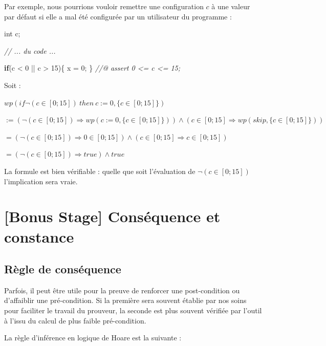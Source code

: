 \documentclass[12pt,francais,]{scrbook}
\newenvironment{Shaded}{}{}
\newcommand{\KeywordTok}[1]{\textcolor[rgb]{0.00,0.44,0.13}{\textbf{{#1}}}}
\newcommand{\DataTypeTok}[1]{\textcolor[rgb]{0.56,0.13,0.00}{{#1}}}
\newcommand{\DecValTok}[1]{\textcolor[rgb]{0.25,0.63,0.44}{{#1}}}
\newcommand{\CommentTok}[1]{\textcolor[rgb]{0.38,0.63,0.69}{\textit{{#1}}}}
\newcommand{\NormalTok}[1]{{#1}}
\begin{document}
Par exemple, nous pourrions vouloir remettre une configuration \(c\) à
une valeur par défaut si elle a mal été configurée par un utilisateur du
programme :

\begin{footnotesize}\begin{Shaded}
\begin{Highlighting}[]
\DataTypeTok{int} \NormalTok{c;}

\CommentTok{// ... du code ...}

\KeywordTok{if}\NormalTok{(c < }\DecValTok{0} \NormalTok{|| c > }\DecValTok{15}\NormalTok{)\{}
  \NormalTok{x = }\DecValTok{0}\NormalTok{;}
\NormalTok{\}}
\CommentTok{//@ assert 0 <= c <= 15;}
\end{Highlighting}
\end{Shaded}\end{footnotesize}

Soit :

\(wp(if \neg (c \in [0;15])\ then\ c := 0, \{c \in [0;15]\})\)

\(:= (\neg (c \in [0;15])\Rightarrow wp(c := 0, \{c \in [0;15]\})) \wedge (c \in [0;15]\Rightarrow wp(skip, \{c \in [0;15]\}))\)

\(= (\neg (c \in [0;15]) \Rightarrow 0 \in [0;15]) \wedge (c \in [0;15] \Rightarrow c \in [0;15])\)

\(= (\neg (c \in [0;15]) \Rightarrow true) \wedge true\)

La formule est bien vérifiable : quelle que soit l'évaluation de
\(\neg (c \in [0;15])\) l'implication sera vraie.

\section{{[}Bonus Stage{]} Conséquence et
constance}\label{bonus-stage-consuxe9quence-et-constance}

\subsection{Règle de conséquence}\label{ruxe8gle-de-consuxe9quence}

Parfois, il peut être utile pour la preuve de renforcer une
post-condition ou d'affaiblir une pré-condition. Si la première sera
souvent établie par nos soins pour faciliter le travail du prouveur, la
seconde est plus souvent vérifiée par l'outil à l'issu du calcul de plus
faible pré-condition.

La règle d'inférence en logique de Hoare est la suivante :
\end{document}
